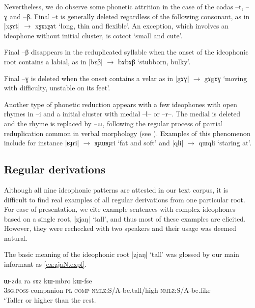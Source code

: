 \documentclass[oldfontcommands,oneside,a4paper,11pt]{article}
\newcommand{\ipa}[1]{{\phon \mbox{#1}}} %
\begin{document}
Nevertheless, we do observe some phonetic attrition in the case of  the codas \ipa{--t}, \ipa{--ɣ} and \ipa{--β}. Final \ipa{--t} is generally deleted regardless of the following consonant, as in  |\ipa{xʂɤt}| $\rightarrow$ \ipa{xʂɤxʂɤt} `long, thin and flexible'. An exception, which involves an ideophone without initial cluster, is \ipa{cotcot} `small and cute'.

Final \ipa{--β} disappears in the reduplicated syllable when the onset of the ideophonic root contains a labial, as in |\ipa{bɤβ}| $\rightarrow$  \ipa{bɤbɤβ} `stubborn, bulky'.


 Final \ipa{--ɣ} is  deleted when the onset contains a velar as in |\ipa{gɤɣ}| $\rightarrow$ \ipa{gɤgɤɣ} `moving with difficulty, unstable on its feet'. 

Another type of phonetic reduction appears with a few ideophones with open rhymes in \ipa{--i} and a initial cluster with medial \ipa{--l--} or \ipa{--r--}. The medial is deleted and the rhyme is replaced by \ipa{--ɯ}, following the regular process of partial reduplication common in verbal morphology (see \citealt[25-60]{jacques04these}). Examples of this phenomenon include for instance |\ipa{ʁɟri}| $\rightarrow$ \ipa{ʁɟɯʁɟri} `fat and soft' and  |\ipa{qli}| $\rightarrow$ \ipa{qɯqli} `staring at'.


\subsection{Regular derivations} \label{sec:ideo.regular}
 Although all nine ideophonic patterns are attested in our text corpus, it is difficult to find real examples of all regular derivations from one particular root. For ease of presentation, we cite example sentences with complex ideophones based on a single root, |\ipa{zjaŋ}|  `tall', and thus most of these examples are elicited. However, they were rechecked with two speakers and their usage was deemed natural.


The basic meaning of the ideophonic root |\ipa{zjaŋ}|  `tall' was glossed by our main informant as \ref{ex:zjaN.expl}.
\begin{exe} 
\ex \label{ex:zjaN.expl}
\gll 
\ipa{ɯ-zda}  	\ipa{ra}  	\ipa{sɤz}  	\ipa{kɯ-mbro}  	\ipa{kɯ-fse}  \\
\textsc{3sg.poss}-companion \textsc{pl} \textsc{comp} \textsc{nmlz}:S/A-be.tall/high \textsc{nmlz}:S/A-be.like \\
\glt `Taller or higher than the rest. 
\end{exe}
 
\end{document}
